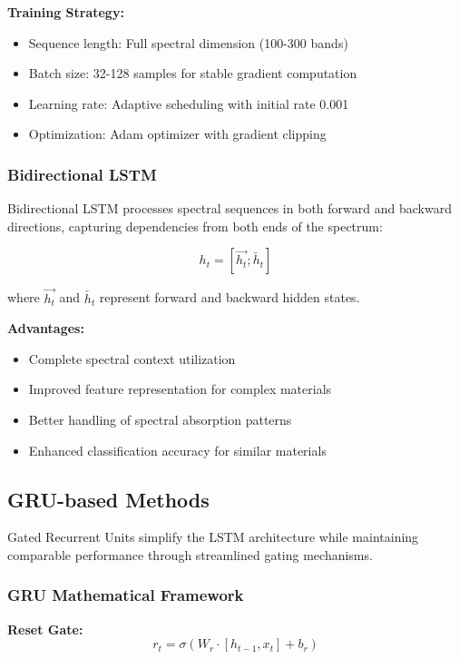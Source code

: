 \documentclass[journal]{IEEEtran}
\begin{document}
\textbf{Training Strategy:}
\begin{itemize}
\item Sequence length: Full spectral dimension (100-300 bands)
\item Batch size: 32-128 samples for stable gradient computation
\item Learning rate: Adaptive scheduling with initial rate 0.001
\item Optimization: Adam optimizer with gradient clipping
\end{itemize}

\subsubsection{Bidirectional LSTM}

Bidirectional LSTM processes spectral sequences in both forward and backward directions, capturing dependencies from both ends of the spectrum:

\begin{equation}
h_t = [\overrightarrow{h_t}; \overleftarrow{h_t}]
\end{equation}

where $\overrightarrow{h_t}$ and $\overleftarrow{h_t}$ represent forward and backward hidden states.

\textbf{Advantages:}
\begin{itemize}
\item Complete spectral context utilization
\item Improved feature representation for complex materials
\item Better handling of spectral absorption patterns
\item Enhanced classification accuracy for similar materials
\end{itemize}

\subsection{GRU-based Methods}

Gated Recurrent Units simplify the LSTM architecture while maintaining comparable performance through streamlined gating mechanisms.

\subsubsection{GRU Mathematical Framework}

\textbf{Reset Gate:}
\begin{equation}
r_t = \sigma(W_r \cdot [h_{t-1}, x_t] + b_r)
\end{equation}
\end{document}
